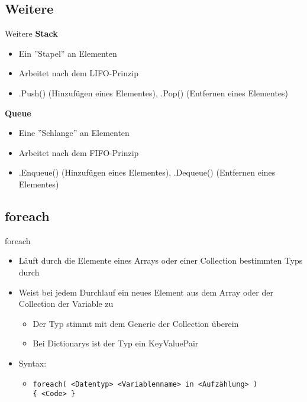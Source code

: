 \subsection{Weitere}
\begin{frame}{Weitere}
	\textbf{Stack}\\
	\begin{itemize}
		\item Ein ''Stapel'' an Elementen
		\item Arbeitet nach dem LIFO-Prinzip
		\item \alert{.Push()} (Hinzufügen eines Elementes), \alert{.Pop()} (Entfernen eines Elementes)
	\end{itemize}
	
	\textbf{Queue}\\
	\begin{itemize}
		\item Eine ''Schlange'' an Elementen
		\item Arbeitet nach dem FIFO-Prinzip
		\item \alert{.Enqueue()} (Hinzufügen eines Elementes), \alert{.Dequeue()} (Entfernen eines Elementes)
	\end{itemize}
	
\end{frame}

\subsection{foreach}
\begin{frame}{foreach}
	\begin{itemize}
		\item Läuft durch die Elemente eines Arrays oder einer Collection bestimmten Typs durch 
		\item Weist bei jedem Durchlauf ein neues Element aus dem Array oder der Collection der Variable zu
		\begin{itemize}
			\item Der Typ stimmt mit dem Generic der Collection überein
			\item Bei Dictionarys ist der Typ ein \alert{KeyValuePair}		
		\end{itemize}
		\item Syntax:
		\begin{itemize}
			\item \texttt{foreach( \alert{<Datentyp> <Variablenname>} in \alert{<Aufzählung>} )\\ \{ \alert{<Code>} \}}
		\end{itemize}
	\end{itemize}
		
\end{frame}


